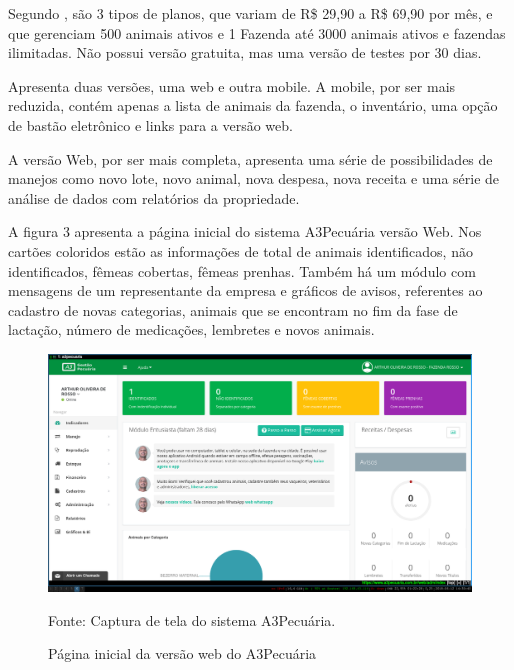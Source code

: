 Segundo , são 3 tipos de planos, que variam de R\$ 29,90 a R\$ 69,90 por mês, e que gerenciam 500 animais ativos e 1 Fazenda até 3000 animais ativos e fazendas ilimitadas. Não possui versão gratuita, mas uma versão de testes por 30 dias.

Apresenta duas versões, uma web e outra mobile. A mobile, por ser mais reduzida, contém apenas a lista de animais da fazenda, o inventário, uma opção de bastão eletrônico e links para a versão web.

A versão Web, por ser mais completa, apresenta uma série de possibilidades de manejos como novo lote, novo animal, nova despesa, nova receita e uma série de análise de dados com relatórios da propriedade.

A figura 3 apresenta a página inicial do sistema A3Pecuária versão Web. Nos cartões coloridos estão as informações de total de animais identificados, não identificados, fêmeas cobertas, fêmeas prenhas. Também há um módulo com mensagens de um representante da empresa e gráficos de avisos, referentes ao cadastro de novas categorias, animais que se encontram no fim da fase de lactação, número de medicações, lembretes e novos animais.


\begin{figure}[H]
	\begin{center}
		\caption{Página inicial da versão web do A3Pecuária}
		\includegraphics[width=\textwidth]{../img/a3pecuaria.png}

		Fonte: Captura de tela do sistema A3Pecuária.
	\end{center}
\end{figure}


